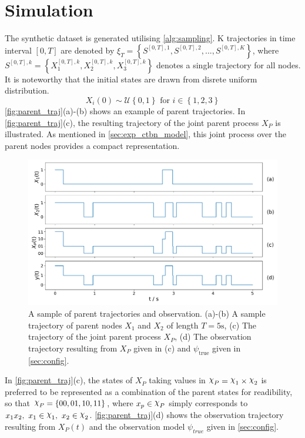 \section{Simulation}
\label{sec:simulation}
The synthetic dataset is generated utilising \cref{alg:sampling}. K trajectories in time interval $ [0, T] $ are denoted by $ \xi_T = \left\lbrace S^{[0,T], 1}, S^{[0,T], 2}, ..., S^{[0,T], K} \right\rbrace  $, where $ S^{[0,T],k} = \left\lbrace X_1^{[0,T],k} , X_2^{[0,T],k}, X_3^{[0,T],k}\right\rbrace $ denotes a single trajectory for all nodes. It is noteworthy that the initial states are drawn from disrete uniform distribution.
\begin{equation}
X_i(0) \sim \mathcal{U} \left\lbrace 0, 1\right\rbrace  \text{ for } i \in \left\lbrace 1,2,3\right\rbrace 
\end{equation}
\autoref{fig:parent_traj}(a)-(b) shows an example of parent trajectories. In \autoref{fig:parent_traj}(c), the resulting trajectory of the joint parent process $ X_P $ is illustrated. As mentioned in \cref{sec:exp_ctbn_model}, this joint process over the parent nodes provides a compact representation. 
\begin{figure}[H]
	\begin{center}
		\includegraphics[width=.90\textwidth]{figures/sim_example/parent_traj}
		\caption[Parent trajectories and observation]{A sample of parent trajectories and observation. (a)-(b) A sample trajectory of parent nodes $ X_1 $ and $ X_2 $ of length $ T=5\text{s} $, (c) The trajectory of the joint parent process $ X_P $, (d) The observation trajectory resulting from $ X_P $ given in (c) and $ \psi_{\text{true}} $ given in \cref{sec:config}.}
		\label{fig:parent_traj}
	\end{center}
\end{figure}
In \autoref{fig:parent_traj}(c), the states of $ X_P $ taking values in $ \rchi_P = \rchi_1 \times \rchi_2 $ is preferred to be represented as a combination of the parent states for readibility, so that $ \rchi_P = \left\lbrace 00, 01, 10, 11\right\rbrace  $, where $ x_p \in \rchi_P $ simply corresponds to $ x_1x_2,\ x_1\in \rchi_1,\  x_2\in \rchi_2 $. \autoref{fig:parent_traj}(d) shows the observation trajectory resulting from $ X_P(t) $ and the observation model $ \psi_{true} $ given in \cref{sec:config}. \\
